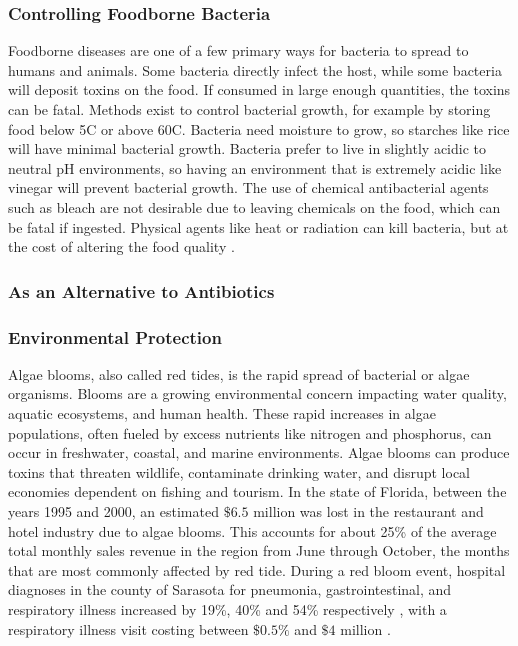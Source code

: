 \subsubsection{Controlling Foodborne Bacteria}
Foodborne diseases are one of a few primary ways for bacteria to spread to humans and animals. Some bacteria directly infect the host, while some bacteria will deposit toxins on the food. If consumed in large enough quantities, the toxins can be fatal. Methods exist to control bacterial growth, for example by storing food below 5C or above 60C. Bacteria need moisture to grow, so starches like rice will have minimal bacterial growth. Bacteria prefer to live in slightly acidic to neutral pH environments, so having an environment that is extremely acidic like vinegar will prevent bacterial growth. The use of chemical antibacterial agents such as bleach are not desirable due to leaving chemicals on the food, which can be fatal if ingested. Physical agents like heat or radiation can kill bacteria, but at the cost of altering the food quality \cite{fieseler_food_2021}. 

\subsubsection{As an Alternative to Antibiotics}


\subsubsection{Environmental Protection}
Algae blooms, also called red tides, is the rapid spread of bacterial or algae organisms. Blooms are a growing environmental concern impacting water quality, aquatic ecosystems, and human health. These rapid increases in algae populations, often fueled by excess nutrients like nitrogen and phosphorus, can occur in freshwater, coastal, and marine environments. Algae blooms can produce toxins that threaten wildlife, contaminate drinking water, and disrupt local economies dependent on fishing and tourism. In the state of Florida, between the years 1995 and 2000, an estimated $\$6.5$ million was lost in the restaurant and hotel industry due to algae blooms. This accounts for about 25\% of the average total monthly sales revenue in the region from June through October, the months that are most commonly affected by red tide\cite{PDFEconomicImpacts}. During a red bloom event, hospital diagnoses in the county of Sarasota for pneumonia, gastrointestinal, and respiratory illness increased by 19\%, 40\% and 54\% respectively \cite{chengCharacterizationMarineAerosol2005, kirkpatrickGastrointestinalEmergencyRoom2010}, with a respiratory illness visit costing between $\$0.5\%$ and $\$4$ million \cite{hoaglandCostsRespiratoryIllnesses2009}. 

